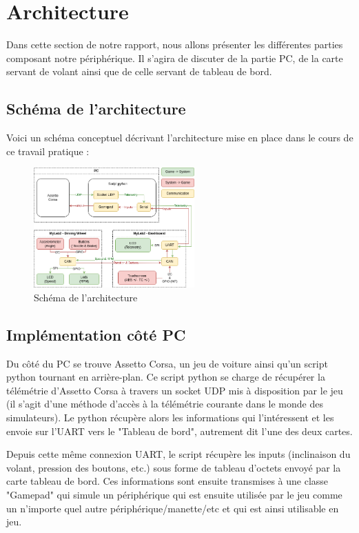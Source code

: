\documentclass[french, 11pt]{article}
\begin{document}

    \section{Architecture}

		Dans cette section de notre rapport, nous allons présenter les différentes parties composant notre périphérique. Il s'agira de discuter de la partie PC, de la carte servant de volant ainsi que de celle servant de tableau de bord.

		\subsection{Schéma de l'architecture}

			Voici un schéma conceptuel décrivant l'architecture mise en place dans le cours de ce travail pratique :

			\begin{figure}[H]
				\centering
				\includegraphics[width=0.55\textwidth]{Images/architecture.drawio.png}
				\caption{Schéma de l'architecture}
			\end{figure}
			
        \subsection{Implémentation côté PC}

        Du côté du PC se trouve Assetto Corsa, un jeu de voiture ainsi qu'un script python tournant en arrière-plan. Ce script python se charge de récupérer la télémétrie d'Assetto Corsa à travers un socket UDP mis à disposition par le jeu (il s'agit d'une méthode d'accès à la télémétrie courante dans le monde des simulateurs). Le python récupère alors les informations qui l'intéressent et les envoie sur l'UART vers le "Tableau de bord", autrement dit l'une des deux cartes. 
		
		Depuis cette même connexion UART, le script récupère les inputs (inclinaison du volant, pression des boutons, etc.) sous forme de tableau d'octets envoyé par la carte tableau de bord. Ces informations sont ensuite transmises à une classe "Gamepad" qui simule un périphérique qui est ensuite utilisée par le jeu comme un n'importe quel autre périphérique/manette/etc et qui est ainsi utilisable en jeu.
\end{document}

